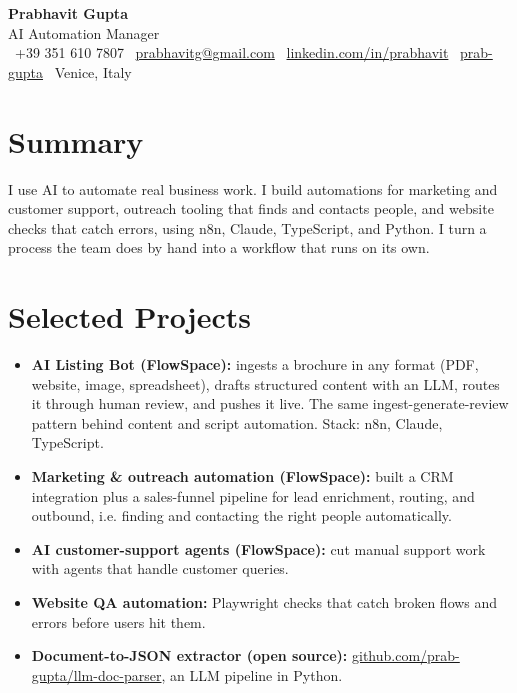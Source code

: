 \documentclass[a4paper,10pt]{article}
\begin{document}
\begin{center}
 {\Huge\bfseries Prabhavit Gupta}\\[3pt]
 {\color{accent}\large AI Automation Manager}\\[5pt]
 \faPhone\ +39 351 610 7807 \quad
 \faEnvelope\ \href{mailto:prabhavitg@gmail.com}{prabhavitg@gmail.com} \quad
 \faLinkedin\ \href{https://www.linkedin.com/in/prabhavit/}{linkedin.com/in/prabhavit} \quad
 \faGithub\ \href{https://github.com/prab-gupta}{prab-gupta} \quad
 \faMapMarker*\ Venice, Italy
\end{center}

\section{Summary}
I use AI to automate real business work. I build automations for marketing and customer support, outreach tooling that finds and contacts people, and website checks that catch errors, using n8n, Claude, TypeScript, and Python. I turn a process the team does by hand into a workflow that runs on its own.

\section{Selected Projects}
\begin{itemize}
 \item \textbf{AI Listing Bot (FlowSpace):} ingests a brochure in any format (PDF, website, image, spreadsheet), drafts structured content with an LLM, routes it through human review, and pushes it live. The same ingest-generate-review pattern behind content and script automation. Stack: n8n, Claude, TypeScript.
 \item \textbf{Marketing \& outreach automation (FlowSpace):} built a CRM integration plus a sales-funnel pipeline for lead enrichment, routing, and outbound, i.e. finding and contacting the right people automatically.
 \item \textbf{AI customer-support agents (FlowSpace):} cut manual support work with agents that handle customer queries.
 \item \textbf{Website QA automation:} Playwright checks that catch broken flows and errors before users hit them.
 \item \textbf{Document-to-JSON extractor (open source):} \href{https://github.com/prab-gupta/llm-doc-parser}{github.com/prab-gupta/llm-doc-parser}, an LLM pipeline in Python.
\end{itemize}
\end{document}
